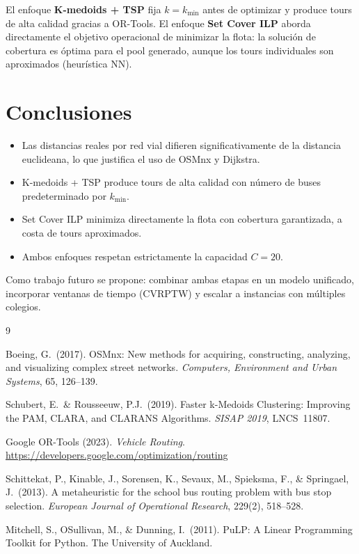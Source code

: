 \documentclass[12pt,a4paper]{article}
\begin{document}
El enfoque \textbf{K-medoids + TSP} fija $k=k_{\min}$ antes de optimizar
y produce tours de alta calidad gracias a OR-Tools.
El enfoque \textbf{Set Cover ILP} aborda directamente el objetivo operacional
de minimizar la flota: la soluci\'on de cobertura es \'optima para el pool
generado, aunque los tours individuales son aproximados (heur\'istica NN).

\section{Conclusiones}

\begin{itemize}
  \item Las distancias reales por red vial difieren significativamente de la
        distancia euclideana, lo que justifica el uso de OSMnx y Dijkstra.
  \item K-medoids + TSP produce tours de alta calidad con n\'umero de buses
        predeterminado por $k_{\min}$.
  \item Set Cover ILP minimiza directamente la flota con cobertura garantizada,
        a costa de tours aproximados.
  \item Ambos enfoques respetan estrictamente la capacidad $C=20$.
\end{itemize}

Como trabajo futuro se propone: combinar ambas etapas en un modelo unificado,
incorporar ventanas de tiempo (CVRPTW) y escalar a instancias con m\'ultiples colegios.


\begin{thebibliography}{9}

Boeing, G.\ (2017).
OSMnx: New methods for acquiring, constructing, analyzing, and visualizing
complex street networks.
\textit{Computers, Environment and Urban Systems}, 65, 126--139.

Schubert, E.\ \& Rousseeuw, P.J.\ (2019).
Faster k-Medoids Clustering: Improving the PAM, CLARA, and CLARANS Algorithms.
\textit{SISAP 2019}, LNCS~11807.

Google OR-Tools (2023).
\textit{Vehicle Routing}.
\url{https://developers.google.com/optimization/routing}

Schittekat, P., Kinable, J., Sorensen, K., Sevaux, M., Spieksma, F.,
\& Springael, J.\ (2013).
A metaheuristic for the school bus routing problem with bus stop selection.
\textit{European Journal of Operational Research}, 229(2), 518--528.

Mitchell, S., OSullivan, M., \& Dunning, I.\ (2011).
PuLP: A Linear Programming Toolkit for Python.
The University of Auckland.

\end{thebibliography}
\end{document}
